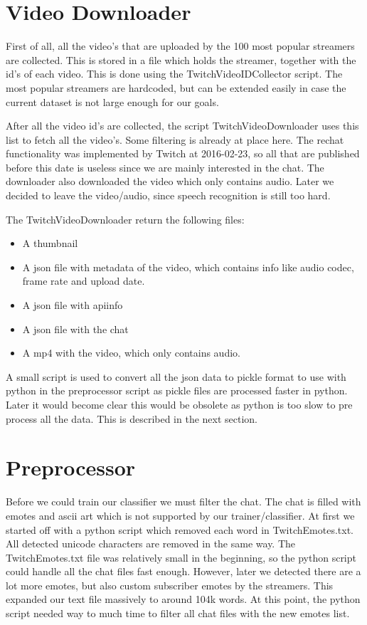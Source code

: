 \documentclass[final]{report}
\begin{document}
\section{Video Downloader}
First of all, all the video's that are uploaded by the 100 most popular streamers are collected. This is stored in a file which holds the streamer, together with the id's of each video.
This is done using the TwitchVideoIDCollector script. The most popular streamers are hardcoded, but can be extended easily in case the current dataset is not large enough for our goals.

After all the video id's are collected, the script TwitchVideoDownloader uses this list to fetch all the video's.
Some filtering is already at place here. The rechat functionality was implemented by Twitch at 2016-02-23, so all that are published before this date is useless since we are mainly interested in the chat.
The downloader also downloaded the video which only contains audio. Later we decided to leave the video/audio, since speech recognition is still too hard.

The TwitchVideoDownloader return the following files:
\begin{itemize}
\item A thumbnail
\item A json file with metadata of the video, which contains info like audio codec, frame rate and upload date.
\item A json file with apiinfo
\item A json file with the chat
\item A mp4 with the video, which only contains audio.
\end{itemize}

A small script is used to convert all the json data to pickle format to use with python in the preprocessor script as pickle files are processed faster in python. Later it would become clear this would be obsolete as python is too slow to pre process all the data. This is described in the next section.

\section{Preprocessor}
Before we could train our classifier we must filter the chat.
The chat is filled with emotes and ascii art which is not supported by our trainer/classifier.
At first we started off with a python script which removed each word in TwitchEmotes.txt.
All detected unicode characters are removed in the same way.
The TwitchEmotes.txt file was relatively small in the beginning, so the python script could handle all the chat files fast enough.
However, later we detected there are a lot more emotes, but also custom subscriber emotes by the streamers.
This expanded our text file massively to around 104k words. 
At this point, the python script needed way to much time to filter all chat files with the new emotes list.
\end{document}
